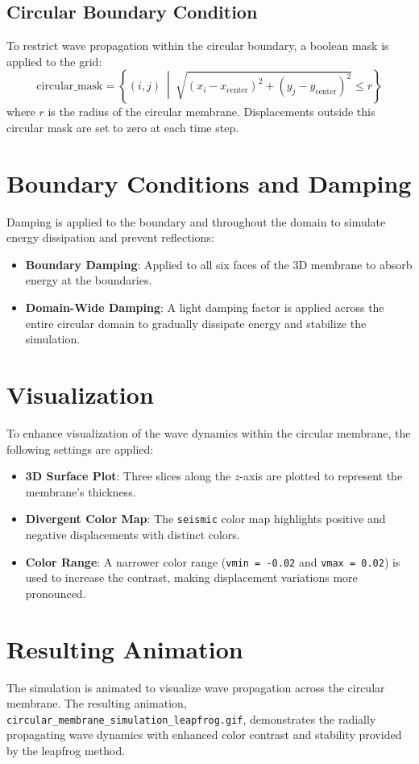 \documentclass{article}
\begin{document}
\subsection{Circular Boundary Condition}

To restrict wave propagation within the circular boundary, a boolean mask is applied to the grid:
\[
\text{circular\_mask} = \left\{ (i, j) \ \middle| \ \sqrt{(x_i - x_{\text{center}})^2 + (y_j - y_{\text{center}})^2} \leq r \right\}
\]
where $r$ is the radius of the circular membrane. Displacements outside this circular mask are set to zero at each time step.

\section{Boundary Conditions and Damping}

Damping is applied to the boundary and throughout the domain to simulate energy dissipation and prevent reflections:
\begin{itemize}
    \item \textbf{Boundary Damping}: Applied to all six faces of the 3D membrane to absorb energy at the boundaries.
    \item \textbf{Domain-Wide Damping}: A light damping factor is applied across the entire circular domain to gradually dissipate energy and stabilize the simulation.
\end{itemize}

\section{Visualization}

To enhance visualization of the wave dynamics within the circular membrane, the following settings are applied:
\begin{itemize}
    \item \textbf{3D Surface Plot}: Three slices along the $z$-axis are plotted to represent the membrane's thickness.
    \item \textbf{Divergent Color Map}: The \texttt{seismic} color map highlights positive and negative displacements with distinct colors.
    \item \textbf{Color Range}: A narrower color range (\texttt{vmin = -0.02} and \texttt{vmax = 0.02}) is used to increase the contrast, making displacement variations more pronounced.
\end{itemize}

\section{Resulting Animation}

The simulation is animated to visualize wave propagation across the circular membrane. The resulting animation, \texttt{circular\_membrane\_simulation\_leapfrog.gif}, demonstrates the radially propagating wave dynamics with enhanced color contrast and stability provided by the leapfrog method.
\end{document}
